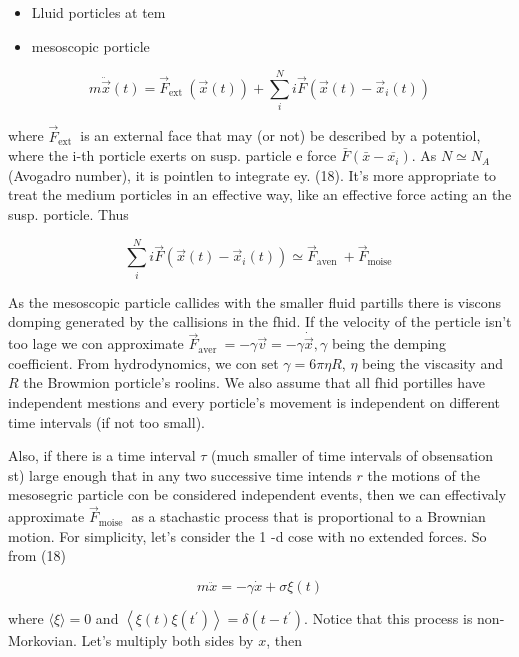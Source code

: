 \begin{itemize}
  \item Lluid porticles at tem
  \item mesoscopic porticle
\end{itemize}


\begin{equation*}
m \ddot{\vec{x}}(t)=\vec{F}_{\text {ext }}(\vec{x}(t))+\sum_{i}^{N} i \vec{F}\left(\vec{x}(t)-\vec{x}_{i}(t)\right) \tag{18}
\end{equation*}


where $\vec{F}_{\text {ext }}$ is an external face that may (or not) be described by a potentiol, where the i-th porticle exerts on susp. particle e force $\bar{F}\left(\bar{x}-\overline{x_{i}}\right)$. As $N \simeq N_{A}$ (Avogadro number), it is pointlen to integrate ey. (18). It's more appropriate to treat the medium porticles in an effective way, like an effective force acting an the susp. porticle. Thus

$$ \sum_{i}^{N} i \vec{F}\left(\vec{x}(t)-\vec{x}_{i}(t)\right) \simeq \vec{F}_{\text {aven }}+\vec{F}_{\text {moise }} $$

As the mesoscopic particle callides with the smaller fluid partills there is viscons domping generated by the callisions in the fhid. If the velocity of the perticle isn't too lage we con approximate $\vec{F}_{\text {aver }}=-\gamma \vec{v}=-\gamma \dot{\vec{x}}, \gamma$ being the demping coefficient. From hydrodynomics, we con set $\gamma=6 \pi \eta R$, $\eta$ being the viscasity and $R$ the Browmion porticle's roolins.
We also assume that all fhid portilles have independent mestions and every porticle's movement is independent on different time intervals (if not too small).

Also, if there is a time interval $\tau$ (much smaller of time intervals of obsensation st) large enough that in any two successive time intends $r$ the motions of the mesosegric particle con be considered independent events, then we can effectivaly approximate $\vec{F}_{\text {moise }}$ as a stachastic process that is proportional to a Brownian motion.
For simplicity, let's consider the 1 -d cose with no extended forces. So from (18)


\begin{equation*}
m \ddot{x}=-\gamma \dot{x}+\sigma \xi(t) \tag{19}
\end{equation*}


where $\langle\xi\rangle=0$ and $\left\langle\xi(t) \xi\left(t^{\prime}\right)\right\rangle=\delta\left(t-t^{\prime}\right)$. Notice that this process is non-Morkovian. Let's multiply both sides by $x$, then


